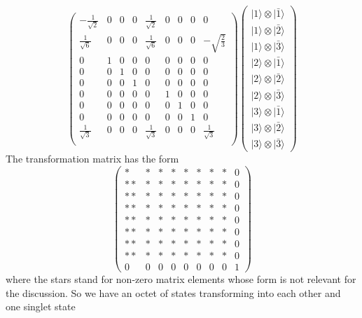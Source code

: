 \documentclass[12pt]{article}
\begin{document}
    \[\left(
\begin{array}{ccccccccc}
 -\frac{1}{\sqrt{2}} & 0 & 0 & 0 & \frac{1}{\sqrt{2}} & 0 &
   0 & 0 & 0 \\
 \frac{1}{\sqrt{6}} & 0 & 0 & 0 & \frac{1}{\sqrt{6}} & 0 &
   0 & 0 & -\sqrt{\frac{2}{3}} \\
 0 & 1 & 0 & 0 & 0 & 0 & 0 & 0 & 0 \\
 0 & 0 & 1 & 0 & 0 & 0 & 0 & 0 & 0 \\
 0 & 0 & 0 & 1 & 0 & 0 & 0 & 0 & 0 \\
 0 & 0 & 0 & 0 & 0 & 1 & 0 & 0 & 0 \\
 0 & 0 & 0 & 0 & 0 & 0 & 1 & 0 & 0 \\
 0 & 0 & 0 & 0 & 0 & 0 & 0 & 1 & 0 \\
 \frac{1}{\sqrt{3}} & 0 & 0 & 0 & \frac{1}{\sqrt{3}} & 0 &
   0 & 0 & \frac{1}{\sqrt{3}} \\
\end{array}
\right)\left(\begin{array}{c}
  |1\rangle\otimes|\bar1\rangle\\
  |1\rangle\otimes|\bar2\rangle\\
  |1\rangle\otimes|\bar3\rangle\\
  |2\rangle\otimes|\bar1\rangle\\
  |2\rangle\otimes|\bar2\rangle\\
  |2\rangle\otimes|\bar3\rangle\\
  |3\rangle\otimes|\bar1\rangle\\
  |3\rangle\otimes|\bar2\rangle\\
  |3\rangle\otimes|\bar3\rangle
\end{array}\right)\]
The transformation matrix has the form
\[\left(\begin{array}{ccccccccc}
  * & * & * & * & * & * & * & * & 0 \\
  ** & * & * & * & * & * & * & * & 0 \\
  ** & * & * & * & * & * & * & * & 0 \\
  ** & * & * & * & * & * & * & * & 0 \\
  ** & * & * & * & * & * & * & * & 0 \\
  ** & * & * & * & * & * & * & * & 0 \\
  ** & * & * & * & * & * & * & * & 0 \\
  ** & * & * & * & * & * & * & * & 0 \\
   0 & 0 & 0 & 0 & 0 & 0 & 0 & 0 & 1 
\end{array}
\right)
\]
where the stars stand for non-zero matrix elements whose form is not relevant for the discussion. So we have an octet of states transforming into each other and one singlet state
\end{document}
